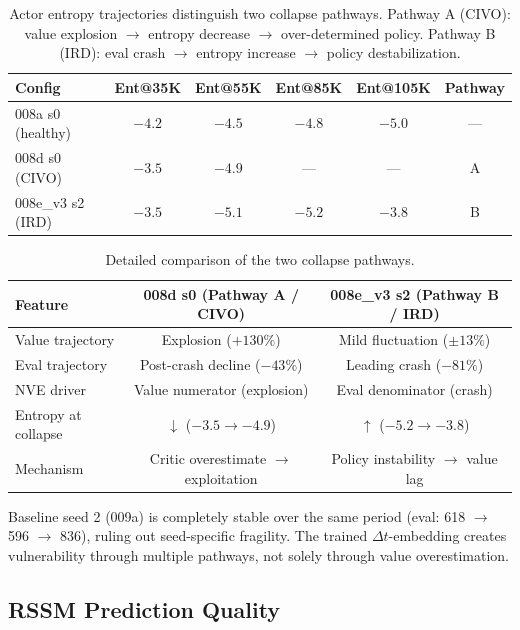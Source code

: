 \documentclass[10pt,letterpaper]{article}
\newcommand{\dt}{\Delta t}
\begin{document}
\begin{table}[h]
\centering
\caption{Actor entropy trajectories distinguish two collapse pathways. Pathway A (CIVO): value explosion $\to$ entropy decrease $\to$ over-determined policy. Pathway B (IRD): eval crash $\to$ entropy increase $\to$ policy destabilization.}
\label{tab:entropy}
\begin{tabular}{lccccc}
\toprule
\textbf{Config} & \textbf{Ent@35K} & \textbf{Ent@55K} & \textbf{Ent@85K} & \textbf{Ent@105K} & \textbf{Pathway} \\
\midrule
008a s0 (healthy)    & $-4.2$ & $-4.5$ & $-4.8$ & $-5.0$ & --- \\
008d s0 (CIVO)       & $-3.5$ & $-4.9$ & ---    & ---    & A \\
008e\_v3 s2 (IRD)    & $-3.5$ & $-5.1$ & $-5.2$ & $-3.8$ & B \\
\bottomrule
\end{tabular}
\end{table}

\begin{table}[h]
\centering
\caption{Detailed comparison of the two collapse pathways.}
\label{tab:pathway_comparison}
\small
\begin{tabular}{lcc}
\toprule
\textbf{Feature} & \textbf{008d s0 (Pathway A / CIVO)} & \textbf{008e\_v3 s2 (Pathway B / IRD)} \\
\midrule
Value trajectory   & Explosion ($+130\%$)          & Mild fluctuation ($\pm 13\%$) \\
Eval trajectory    & Post-crash decline ($-43\%$)  & Leading crash ($-81\%$) \\
NVE driver         & Value numerator (explosion)   & Eval denominator (crash) \\
Entropy at collapse & $\downarrow$ ($-3.5 \to -4.9$) & $\uparrow$ ($-5.2 \to -3.8$) \\
Mechanism          & Critic overestimate $\to$ exploitation & Policy instability $\to$ value lag \\
\bottomrule
\end{tabular}
\end{table}

Baseline seed 2 (009a) is completely stable over the same period (eval: 618 $\to$ 596 $\to$ 836), ruling out seed-specific fragility. The trained $\dt$-embedding creates vulnerability through multiple pathways, not solely through value overestimation.

\subsection{RSSM Prediction Quality}
\label{sec:rssm}
\end{document}
